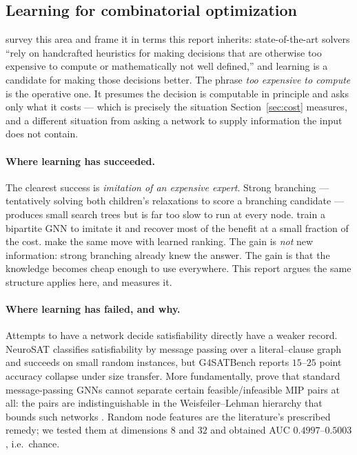 \documentclass[12pt]{article}
\begin{document}
\subsection{Learning for combinatorial optimization}
\label{sec:l4co}

\citet{bengio2021machine} survey this area and frame it in terms this report inherits: state-of-the-art solvers ``rely on handcrafted heuristics for making decisions that are otherwise too expensive to compute or mathematically not well defined,'' and learning is a candidate for making those decisions better. The phrase \emph{too expensive to compute} is the operative one. It presumes the decision is computable in principle and asks only what it costs --- which is precisely the situation Section~\ref{sec:cost} measures, and a different situation from asking a network to supply information the input does not contain.

\paragraph{Where learning has succeeded.} The clearest success is \emph{imitation of an expensive expert}. Strong branching --- tentatively solving both children's relaxations to score a branching candidate --- produces small search trees but is far too slow to run at every node. \citet{gasse2019exact} train a bipartite GNN to imitate it and recover most of the benefit at a small fraction of the cost. \citet{khalil2016learning} make the same move with learned ranking. The gain is \emph{not} new information: strong branching already knew the answer. The gain is that the knowledge becomes cheap enough to use everywhere. This report argues the same structure applies here, and measures it.

\paragraph{Where learning has failed, and why.} Attempts to have a network decide satisfiability directly have a weaker record. NeuroSAT \citep{selsam2019neurosat} classifies satisfiability by message passing over a literal--clause graph and succeeds on small random instances, but G4SATBench \citep{li2023g4satbench} reports $15$--$25$ point accuracy collapse under size transfer. More fundamentally, \citet{chen2023representing} prove that standard message-passing GNNs cannot separate certain feasible/infeasible MIP pairs at all: the pairs are indistinguishable in the Weisfeiler--Lehman hierarchy that bounds such networks \citep{xu2019powerful}. Random node features are the literature's prescribed remedy; we tested them at dimensions $8$ and $32$ and obtained AUC $0.4997$--$0.5003$, i.e.\ chance.
\end{document}
